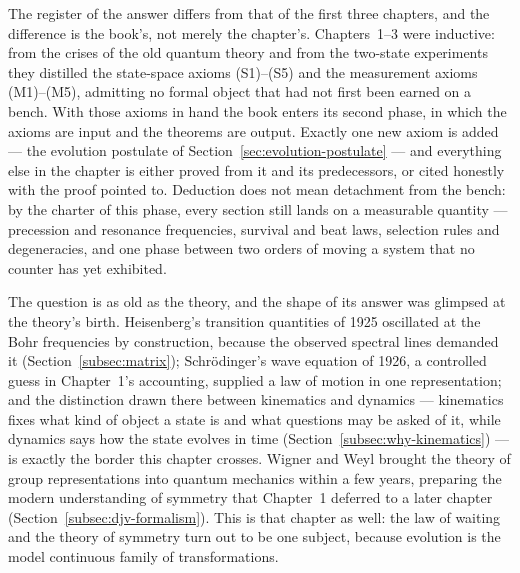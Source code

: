The register of the answer differs from that of the first three chapters, and the difference is the book's, not merely the chapter's. Chapters~1--3 were inductive: from the crises of the old quantum theory and from the two-state experiments they distilled the state-space axioms (S1)--(S5) and the measurement axioms (M1)--(M5), admitting no formal object that had not first been earned on a bench. With those axioms in hand the book enters its second phase, in which the axioms are input and the theorems are output. Exactly one new axiom is added --- the evolution postulate of Section~\ref{sec:evolution-postulate} --- and everything else in the chapter is either proved from it and its predecessors, or cited honestly with the proof pointed to. Deduction does not mean detachment from the bench: by the charter of this phase, every section still lands on a measurable quantity --- precession and resonance frequencies, survival and beat laws, selection rules and degeneracies, and one phase between two orders of moving a system that no counter has yet exhibited.

The question is as old as the theory, and the shape of its answer was glimpsed at the theory's birth. Heisenberg's transition quantities of 1925 oscillated at the Bohr frequencies by construction, because the observed spectral lines demanded it (Section~\ref{subsec:matrix}); Schr\"odinger's wave equation of 1926, a controlled guess in Chapter~1's accounting, supplied a law of motion in one representation; and the distinction drawn there between kinematics and dynamics --- kinematics fixes what kind of object a state is and what questions may be asked of it, while dynamics says how the state evolves in time (Section~\ref{subsec:why-kinematics}) --- is exactly the border this chapter crosses. Wigner and Weyl brought the theory of group representations into quantum mechanics within a few years, preparing the modern understanding of symmetry that Chapter~1 deferred to a later chapter (Section~\ref{subsec:djv-formalism}). This is that chapter as well: the law of waiting and the theory of symmetry turn out to be one subject, because evolution is the model continuous family of transformations.

